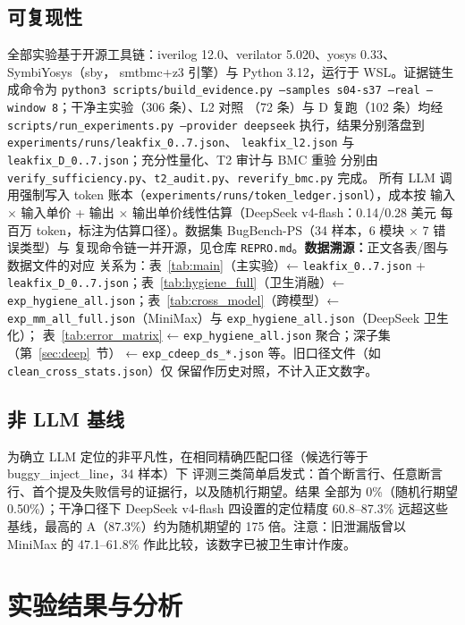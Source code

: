 \documentclass[twocolumn,10pt]{ctexart}
\begin{document}
\subsection{可复现性}

全部实验基于开源工具链：iverilog 12.0、verilator 5.020、yosys 0.33、SymbiYosys（sby，
smtbmc+z3 引擎）与 Python 3.12，运行于 WSL。证据链生成命令为 \texttt{python3
scripts/build\_evidence.py --samples s04-s37 --real --window 8}；干净主实验（306 条）、L2 对照
（72 条）与 D 复跑（102 条）均经 \texttt{scripts/run\_experiments.py --provider deepseek}
执行，结果分别落盘到 \texttt{experiments/runs/leakfix\_0..7.json}、
\texttt{leakfix\_l2.json} 与 \texttt{leakfix\_D\_0..7.json}；充分性量化、T2 审计与 BMC 重验
分别由 \texttt{verify\_sufficiency.py}、\texttt{t2\_audit.py}、\texttt{reverify\_bmc.py} 完成。
所有 LLM 调用强制写入 token 账本（\texttt{experiments/runs/token\_ledger.jsonl}），成本按
输入 $\times$ 输入单价 + 输出 $\times$ 输出单价线性估算（DeepSeek v4-flash：0.14/0.28 美元
每百万 token，标注为估算口径）。数据集 BugBench-PS（34 样本，6 模块 $\times$ 7 错误类型）与
复现命令链一并开源，见仓库 \texttt{REPRO.md}。\textbf{数据溯源：}正文各表/图与数据文件的对应
关系为：表~\ref{tab:main}（主实验）← \texttt{leakfix\_0..7.json} +
\texttt{leakfix\_D\_0..7.json}；表~\ref{tab:hygiene_full}（卫生消融）←
\texttt{exp\_hygiene\_all.json}；表~\ref{tab:cross_model}（跨模型）←
\texttt{exp\_mm\_all\_full.json}（MiniMax）与 \texttt{exp\_hygiene\_all.json}（DeepSeek 卫生化）；
表~\ref{tab:error_matrix} ← \texttt{exp\_hygiene\_all.json} 聚合；深子集（第~\ref{sec:deep}~节）
← \texttt{exp\_cdeep\_ds\_*.json} 等。旧口径文件（如 \texttt{clean\_cross\_stats.json}）仅
保留作历史对照，不计入正文数字。

\subsection{非 LLM 基线}

为确立 LLM 定位的非平凡性，在相同精确匹配口径（候选行等于 buggy\_inject\_line，34 样本）下
评测三类简单启发式：首个断言行、任意断言行、首个提及失败信号的证据行，以及随机行期望。结果
全部为 0\%（随机行期望 0.50\%）；干净口径下 DeepSeek v4-flash 四设置的定位精度 60.8--87.3\%
远超这些基线，最高的 A（87.3\%）约为随机期望的 175 倍。注意：旧泄漏版曾以 MiniMax 的
47.1--61.8\% 作此比较，该数字已被卫生审计作废。

\section{实验结果与分析}\label{sec:results}
\end{document}
